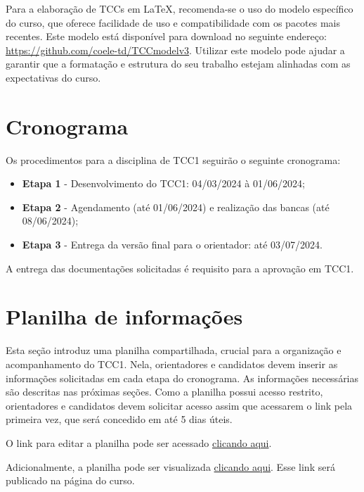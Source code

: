 \documentclass[a4paper, 12pt]{article}
\newcommand{\startdate}{04/03/2024}		%
\newcommand{\agendadate}{01/06/2024}	%
\newcommand{\bancadate}{08/06/2024}		%
\newcommand{\finaldate}{03/07/2024}		%
\begin{document}
	Para a elaboração de TCCs em \LaTeX{}, recomenda-se o uso do modelo específico do curso, que oferece facilidade de uso e compatibilidade com os pacotes mais recentes. Este modelo está disponível para download no seguinte endereço: \url{https://github.com/coele-td/TCCmodelv3}. Utilizar este modelo pode ajudar a garantir que a formatação e estrutura do seu trabalho estejam alinhadas com as expectativas do curso.


    \section{Cronograma}
    \label{sec:CRO}
    
    Os procedimentos para a disciplina de TCC1 seguirão o seguinte cronograma:
    \begin{itemize}
    	\item \textbf{Etapa 1} - Desenvolvimento do TCC1: \startdate{} à \agendadate;
    	\item \textbf{Etapa 2} - Agendamento (até \agendadate) e realização das bancas (até \bancadate);
    	\item \textbf{Etapa 3} - Entrega da versão final para o orientador: até \finaldate.    	
    \end{itemize}

	A entrega das documentações solicitadas é requisito para a aprovação em TCC1.

	\section{Planilha de informações}
	\label{sec:pla}
	Esta seção introduz uma planilha compartilhada, crucial para a organização e acompanhamento do TCC1. Nela, orientadores e candidatos devem inserir as informações solicitadas em cada etapa do cronograma. As informações necessárias são descritas nas próximas seções. Como a planilha possui acesso restrito, orientadores e candidatos devem solicitar acesso assim que acessarem o link pela primeira vez, que será concedido em até 5 dias úteis.
	
	O link para editar a planilha pode ser acessado \href{https://docs.google.com/spreadsheets/d/1AfsG1P6wrw42CbZCDbQzsXFXmxfrMmZ7gpn8NvR8cq4/edit?usp=sharing}{clicando aqui}.
	
	Adicionalmente, a planilha pode ser visualizada \href{https://docs.google.com/spreadsheets/d/e/2PACX-1vQKQ_bI1Ka_BKbx_LZkVxxYrV69ROWFWqE8V_niYUJP7EjumnNhUP65tGiUxh32qgDYW_WWdC5nJelJ/pubhtml}{clicando aqui}. Esse link será publicado na página do curso.
\end{document}
